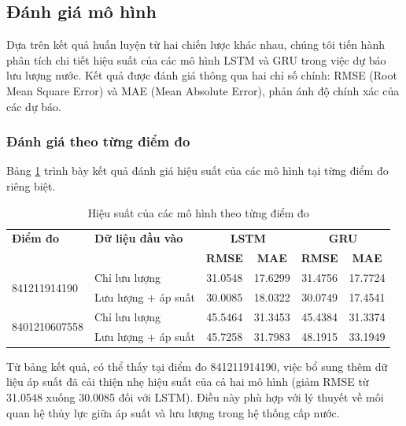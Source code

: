 \subsection{Đánh giá mô hình}

Dựa trên kết quả huấn luyện từ hai chiến lược khác nhau, chúng tôi tiến hành phân tích chi tiết hiệu suất của các mô hình LSTM và GRU trong việc dự báo lưu lượng nước. Kết quả được đánh giá thông qua hai chỉ số chính: RMSE (Root Mean Square Error) và MAE (Mean Absolute Error), phản ánh độ chính xác của các dự báo.

\subsubsection{Đánh giá theo từng điểm đo}

Bảng \ref{tab:model_performance_by_location} trình bày kết quả đánh giá hiệu suất của các mô hình tại từng điểm đo riêng biệt.

\begin{table}[htbp]
    \centering
    \begin{tabular}{|l|l|c|c|c|c|}
        \hline
        \textbf{Điểm đo} & \textbf{Dữ liệu đầu vào} & \multicolumn{2}{c|}{\textbf{LSTM}} & \multicolumn{2}{c|}{\textbf{GRU}} \\
        \cline{3-6}
        & & \textbf{RMSE} & \textbf{MAE} & \textbf{RMSE} & \textbf{MAE} \\
        \hline
        \multirow{2}{*}{841211914190} & Chỉ lưu lượng & 31.0548 & 17.6299 & 31.4756 & 17.7724 \\
        \cline{2-6}
        & Lưu lượng + áp suất & 30.0085 & 18.0322 & 30.0749 & 17.4541 \\
        \hline
        \multirow{2}{*}{8401210607558} & Chỉ lưu lượng & 45.5464 & 31.3453 & 45.4384 & 31.3374 \\
        \cline{2-6}
        & Lưu lượng + áp suất & 45.7258 & 31.7983 & 48.1915 & 33.1949 \\
        \hline
    \end{tabular}
    \caption{Hiệu suất của các mô hình theo từng điểm đo}
    \label{tab:model_performance_by_location}
\end{table}

Từ bảng kết quả, có thể thấy tại điểm đo 841211914190, việc bổ sung thêm dữ liệu áp suất đã cải thiện nhẹ hiệu suất của cả hai mô hình (giảm RMSE từ 31.0548 xuống 30.0085 đối với LSTM). Điều này phù hợp với lý thuyết về mối quan hệ thủy lực giữa áp suất và lưu lượng trong hệ thống cấp nước.

